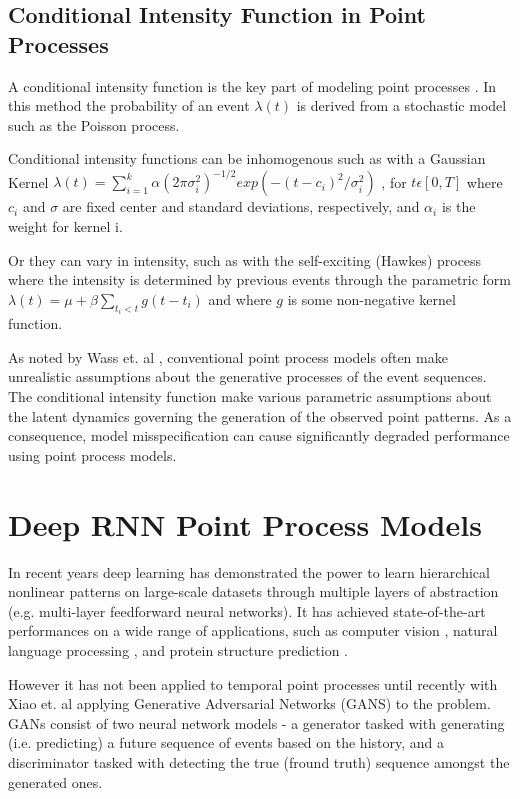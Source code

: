 \subsection{Conditional Intensity Function in Point Processes}

A conditional intensity function is the key part of modeling point processes \parencite{DuWang}. In this method the probability of an event $\lambda(t)$ is derived from a stochastic model such as the Poisson process. 

Conditional intensity functions can be inhomogenous such as with a Gaussian Kernel $\lambda(t) = \sum^k_{i=1}\alpha(2\pi \sigma^2_i)^{-1/2}exp(-(t-c_i)^2/\sigma^2_i)$
, for $t \epsilon [0,T]$ where $c_i$ and $\sigma$ are fixed center and standard deviations, respectively, and $\alpha_i$ is the weight for kernel i.

Or they can vary in intensity, such as with the self-exciting (Hawkes) process where the intensity is determined by previous events through the parametric form $\lambda(t) = \mu + \beta \sum_{t_i<t}g(t-t_i)$ and where $g$ is some non-negative kernel function.

As noted by Wass et. al \parencite{Wass}, conventional point process models often make unrealistic assumptions about the generative processes of the event sequences. The conditional intensity function make various parametric assumptions about the latent dynamics governing the generation of the observed point patterns. As a consequence, model misspecification can cause significantly degraded
performance using point process models.

\section{Deep RNN Point Process Models}

In recent years deep learning has demonstrated the power to learn hierarchical nonlinear patterns on large-scale datasets \parencite{DL} through multiple layers of abstraction (e.g. multi-layer feedforward neural networks). It has achieved state-of-the-art performances on a wide range of applications, such as computer vision \parencite{ImageNet}, natural language processing \parencite{Socher}, and protein structure prediction \parencite{Lena}.

However it has not been applied to temporal point processes until recently with Xiao et. al \parencite{Wass} applying Generative Adversarial Networks (GANS) to the problem. GANs consist of two neural network models - a generator tasked with generating (i.e. predicting) a future sequence of events based on the history, and a discriminator tasked with detecting the true (fround truth) sequence amongst the generated ones.

